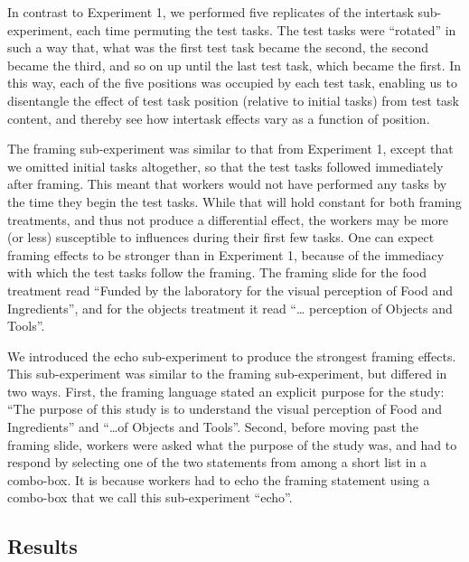 \documentclass{sigchi}
\begin{document}
In contrast to Experiment 1, we performed five replicates of the intertask
sub-experiment, each time permuting the test tasks.  The test tasks were
``rotated'' in such a way that, what was the first test task became
the second, the second became the third, and so on up until the last test
task, which became the first.  In this way, each of the five positions
was occupied by each test task, enabling us to disentangle the effect of
test task position (relative to initial tasks) from test task content,
and thereby see how intertask effects vary as a function of position.

The framing sub-experiment was similar to that from Experiment 1, except
that we omitted initial tasks altogether, so that the test tasks followed
immediately after framing.  This meant that workers would not have 
performed any tasks by the time they begin the test tasks.  While that will
hold constant for both framing treatments, and thus not produce a 
differential effect, the workers may be more (or less) susceptible to 
influences during their first few tasks.  One can expect framing effects
to be stronger than in Experiment 1, because of the immediacy with which
the test tasks follow the framing.  The framing slide for the food 
treatment read ``Funded by the laboratory for the visual perception of 
Food and Ingredients'', and for the objects treatment it read ``\ldots
perception of Objects and Tools''.

We introduced the echo sub-experiment to produce the strongest framing 
effects.  This sub-experiment was similar to the framing sub-experiment,
but differed in two ways.  First, the framing language stated an explicit
purpose for the study: ``The purpose of this study is to understand the 
visual perception of Food and Ingredients'' 
and ``\ldots of Objects and Tools''.  Second, before moving past the
framing slide, workers were asked what the purpose of the study was, and
had to respond by selecting one of the two statements from among a short
list in a combo-box.  It is because workers had to echo the framing 
statement using a combo-box that we call this sub-experiment ``echo''.

\subsection{Results}
\end{document}
